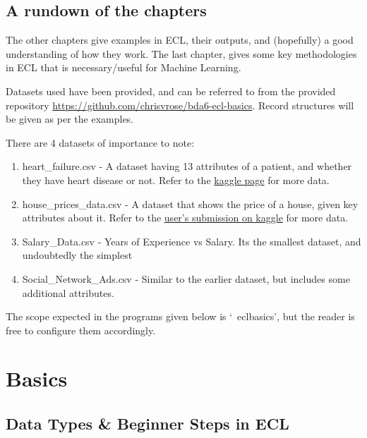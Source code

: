 \documentclass[a4paper,oneside,12pt]{book}
\begin{document}
\section{A rundown of the chapters}

The other chapters give examples in ECL, their outputs, and (hopefully) a good understanding of how they work. The last chapter, gives some key methodologies in ECL that is necessary/useful for Machine Learning.

Datasets used have been provided, and can be referred to from the provided repository \url{https://github.com/chrisvrose/bda6-ecl-basics}. Record structures will be given as per the examples.

There are 4 datasets of importance to note:
\begin{enumerate}
    \item heart\_failure.csv - A dataset having 13 attributes of a patient, and whether they have heart disease or not. Refer to the \href{https://www.kaggle.com/ronitf/heart-disease-uci}{kaggle page} for more data. 
    \item house\_prices\_data.csv - A dataset that shows the price of a house, given key attributes about it. Refer to the \href{https://www.kaggle.com/shivachandel/kc-house-data}{user's submission on kaggle} for more data.
    \item Salary\_Data.csv - Years of Experience vs Salary. Its the smallest dataset, and undoubtedly the simplest
    \item Social\_Network\_Ads.csv - Similar to the earlier dataset, but includes some additional attributes.
\end{enumerate}

The scope expected in the programs given below is `~eclbasics', but the reader is free to configure them accordingly.

\chapter{Basics}

\section{Data Types \& Beginner Steps in ECL}
\end{document}
